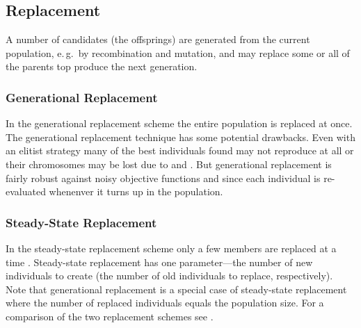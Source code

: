 %
%

	\subsection{Replacement}

A number of candidates (the offsprings) are generated from the current
population, e.\,g.\ by recombination and mutation,
and may replace some or all of the parents top produce the next
generation.

	\subsubsection{Generational Replacement}

In the generational replacement scheme the entire population is
replaced at once.  The generational replacement technique has some
potential drawbacks.  Even with an elitist strategy many of the best
individuals found may not reproduce at all or their chromosomes may be
lost due to  and .  But generational
replacement is fairly robust against noisy objective functions and
 since each individual is re-evaluated whenenver
it turns up in the population.


	\subsubsection{Steady-State Replacement}
	\label{replacement:subsubs:steadyStateReplacement}

In the steady-state replacement scheme only a few members are
replaced at a time \cite{Whitley:89,Syswerda:89}.  Steady-state
replacement has one parameter---the number of new individuals to
create (the number of old individuals to replace, respectively). Note
that generational replacement is a special case of steady-state
replacement where the number of replaced individuals equals the
population size.  For a comparison of the two replacement schemes see
\cite{Syswerda:91}.

